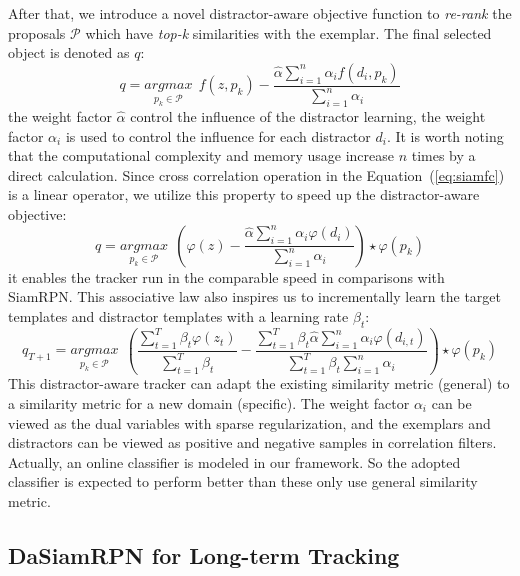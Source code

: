 \documentclass[runningheads]{llncs}
\begin{document}
After that, we introduce a novel distractor-aware objective function to \emph{re-rank} the proposals $\mathcal{P}$ which have \emph{top-k} similarities with the exemplar. The final selected object is denoted as $q$:
\begin{equation}
q = \underset{p_k \in \mathcal{P}}{argmax} ~~f(z,p_k)- \frac{\hat{\alpha}\sum_{i=1}^{n} \alpha_i f(d_i,p_k)}{\sum_{i=1}^{n}\alpha_i }
\label{eq:datobj}
\end{equation}
the weight factor $\hat{\alpha}$ control the influence of the distractor learning, the weight factor $\alpha_i$ is used to control the influence for each distractor $d_i$. It is worth noting that the computational complexity and memory usage increase $n$ times by a direct calculation.
Since cross correlation operation in the Equation~(\ref{eq:siamfc}) is a linear operator, we utilize this property to speed up the distractor-aware objective:
\begin{equation}
q = \underset{p_k \in \mathcal{P}}{argmax} ~~ (\varphi(z) - \frac{\hat{\alpha}\sum_{i=1}^{n} \alpha_i \varphi(d_i)}{\sum_{i=1}^{n}\alpha_i} )\star \varphi(p_k)
\end{equation}
it enables the tracker run in the comparable speed in comparisons with SiamRPN. This associative law also inspires us to incrementally learn the target templates and distractor templates with a learning rate $\beta_t$:
\begin{equation}
q_{T+1} = \underset{p_k \in \mathcal{P}}{argmax} ~~ (\frac{\sum_{t=1}^{T} \beta_t \varphi(z_t)}{\sum_{t=1}^{T} \beta_t} - \frac{\sum_{t=1}^{T}\beta_t\hat{\alpha}\sum_{i=1}^{n} \alpha_i \varphi(d_{i,t})}{\sum_{t=1}^{T} \beta_t\sum_{i=1}^{n}\alpha_i} )\star \varphi(p_k)
\label{eq:dat_update}
\end{equation}
This distractor-aware tracker can adapt the existing similarity metric (general) to a similarity metric for a new domain (specific).
The weight factor $\alpha_i$ can be viewed as the dual variables with sparse regularization, and the exemplars and distractors can be viewed as positive and negative samples in correlation filters. Actually, an online classifier is modeled in our framework. So the adopted classifier is expected to perform better than these only use general similarity metric.


\subsection{DaSiamRPN for Long-term Tracking}
\end{document}
